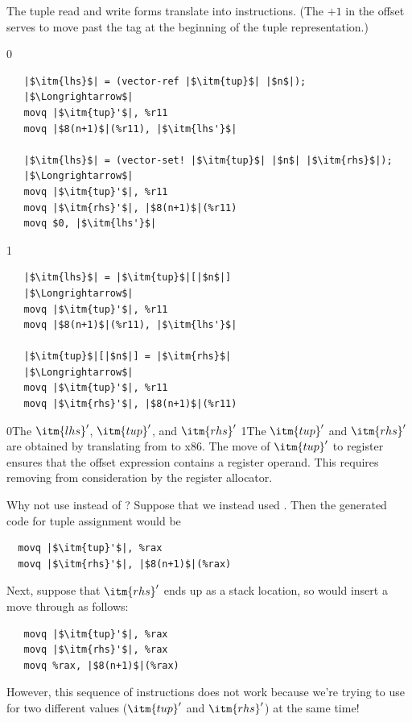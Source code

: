 \documentclass[7x10]{TimesAPriori_MIT}%
\def\racketEd{0}
\def\pythonEd{1}
\def\edition{1}
\newcommand{\racket}[1]{{\if\edition\racketEd{#1}\fi}}
\newcommand{\pythonColor}[0]{}
\newcommand{\python}[1]{{\if\edition\pythonEd\pythonColor #1\fi}}
\numberwithin{theorem}{chapter}
\numberwithin{definition}{chapter}
\numberwithin{equation}{chapter}
\begin{document}
The tuple read and write forms translate into 
instructions.  (The $+1$ in the offset serves to move past the tag at the
beginning of the tuple representation.)
%
\begin{center}
\begin{minipage}{\textwidth}
{\if\edition\racketEd    
\begin{lstlisting}
   |$\itm{lhs}$| = (vector-ref |$\itm{tup}$| |$n$|);
   |$\Longrightarrow$|
   movq |$\itm{tup}'$|, %r11
   movq |$8(n+1)$|(%r11), |$\itm{lhs'}$|

   |$\itm{lhs}$| = (vector-set! |$\itm{tup}$| |$n$| |$\itm{rhs}$|);
   |$\Longrightarrow$|
   movq |$\itm{tup}'$|, %r11
   movq |$\itm{rhs}'$|, |$8(n+1)$|(%r11)
   movq $0, |$\itm{lhs'}$|
\end{lstlisting}
\fi}
{\if\edition\pythonEd\pythonColor    
\begin{lstlisting}
   |$\itm{lhs}$| = |$\itm{tup}$|[|$n$|]
   |$\Longrightarrow$|
   movq |$\itm{tup}'$|, %r11
   movq |$8(n+1)$|(%r11), |$\itm{lhs'}$|

   |$\itm{tup}$|[|$n$|] = |$\itm{rhs}$|
   |$\Longrightarrow$|
   movq |$\itm{tup}'$|, %r11
   movq |$\itm{rhs}'$|, |$8(n+1)$|(%r11)
\end{lstlisting}
\fi}
\end{minipage}
\end{center}
\racket{The $\itm{lhs}'$, $\itm{tup}'$, and $\itm{rhs}'$}
\python{The $\itm{tup}'$ and $\itm{rhs}'$}
are obtained by translating from \LangCVec{} to x86.
%
The move of $\itm{tup}'$ to
register  ensures that the offset expression
 contains a register operand.  This requires
removing  from consideration by the register allocator.

Why not use  instead of ? Suppose that we instead used
. Then the generated code for tuple assignment would be
\begin{lstlisting}
  movq |$\itm{tup}'$|, %rax
  movq |$\itm{rhs}'$|, |$8(n+1)$|(%rax)
\end{lstlisting}
Next, suppose that $\itm{rhs}'$ ends up as a stack location, so
 would insert a move through 
as follows:
\begin{lstlisting}
   movq |$\itm{tup}'$|, %rax
   movq |$\itm{rhs}'$|, %rax
   movq %rax, |$8(n+1)$|(%rax)
\end{lstlisting}
However, this sequence of instructions does not work because we're
trying to use  for two different values ($\itm{tup}'$ and
$\itm{rhs}'$) at the same time!
\end{document}
